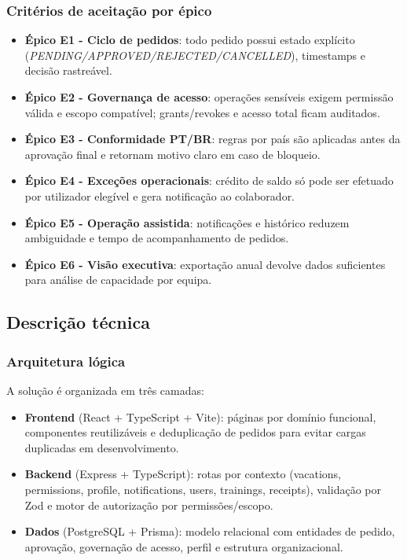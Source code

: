 \documentclass[11pt,a4paper]{article}
\begin{document}
\subsubsection{Critérios de aceitação por épico}
\begin{itemize}
  \item \textbf{Épico E1 - Ciclo de pedidos}: todo pedido possui estado explícito (\textit{PENDING/APPROVED/REJECTED/CANCELLED}), timestamps e decisão rastreável.
  \item \textbf{Épico E2 - Governança de acesso}: operações sensíveis exigem permissão válida e escopo compatível; grants/revokes e acesso total ficam auditados.
  \item \textbf{Épico E3 - Conformidade PT/BR}: regras por país são aplicadas antes da aprovação final e retornam motivo claro em caso de bloqueio.
  \item \textbf{Épico E4 - Exceções operacionais}: crédito de saldo só pode ser efetuado por utilizador elegível e gera notificação ao colaborador.
  \item \textbf{Épico E5 - Operação assistida}: notificações e histórico reduzem ambiguidade e tempo de acompanhamento de pedidos.
  \item \textbf{Épico E6 - Visão executiva}: exportação anual devolve dados suficientes para análise de capacidade por equipa.
\end{itemize}

\subsection{Descrição técnica}
\subsubsection{Arquitetura lógica}
A solução é organizada em três camadas:

\begin{itemize}
  \item \textbf{Frontend} (React + TypeScript + Vite): páginas por domínio funcional, componentes reutilizáveis e deduplicação de pedidos para evitar cargas duplicadas em desenvolvimento.
  \item \textbf{Backend} (Express + TypeScript): rotas por contexto (vacations, permissions, profile, notifications, users, trainings, receipts), validação por Zod e motor de autorização por permissões/escopo.
  \item \textbf{Dados} (PostgreSQL + Prisma): modelo relacional com entidades de pedido, aprovação, governação de acesso, perfil e estrutura organizacional.
\end{itemize}
\end{document}
